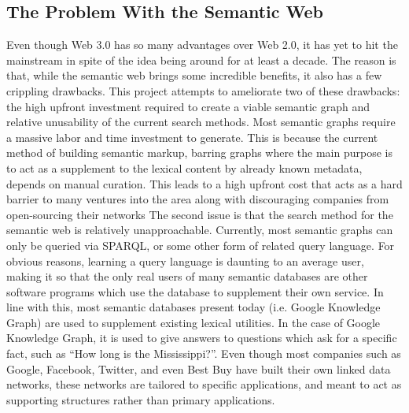 \documentclass[12pt]{article}
\begin{document}
	\subsection{The Problem With the Semantic Web}	
	\quad Even though Web 3.0 has so many advantages over Web 2.0, it has yet to hit the mainstream in spite of the idea being around for at least a decade. The reason is that, while the semantic web brings some incredible benefits, it also has a few crippling drawbacks. This project attempts to ameliorate two of these drawbacks: the high upfront investment required to create a viable semantic graph and relative unusability of the current search methods. Most semantic graphs require a massive labor and time investment to generate. This is because the current method of building semantic markup, barring graphs where the main purpose is to act as a supplement to the lexical content by already known metadata, depends on manual curation. This leads to a high upfront cost that acts as a hard barrier to many ventures into the area along with discouraging companies from open-sourcing their networks The second issue is that the search method for the semantic web is relatively unapproachable. Currently, most semantic graphs can only be queried via SPARQL, or some other form of related query language. For obvious reasons, learning a query language is daunting to an average user, making it so that the only real users of many semantic databases are other software programs which use the database to supplement their own service. In line with this, most semantic databases present today (i.e. Google Knowledge Graph) are used to supplement existing lexical utilities. In the case of Google Knowledge Graph, it is used to give answers to questions which ask for a specific fact, such as “How long is the Mississippi?”. Even though most companies such as Google, Facebook, Twitter, and even Best Buy have built their own linked data networks, these networks are tailored to specific applications, and meant to act as supporting structures rather than primary applications. 
\end{document}
